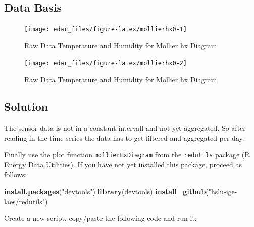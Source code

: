 \documentclass[
  a4paperpaper,
]{book}
\newenvironment{Shaded}{\begin{snugshade}}{\end{snugshade}}
\newcommand{\KeywordTok}[1]{\textcolor[rgb]{0.13,0.29,0.53}{\textbf{#1}}}
\newcommand{\NormalTok}[1]{#1}
\newcommand{\StringTok}[1]{\textcolor[rgb]{0.31,0.60,0.02}{#1}}
\let\oldShaded\Shaded
\let\endoldShaded\endShaded
\renewenvironment{Shaded}{\footnotesize\oldShaded}{\endoldShaded}
\begin{document}
\hypertarget{data-basis-12}{%
\subsection{Data Basis}\label{data-basis-12}}

\begin{figure}
\texttt{[image: edar\_files/figure-latex/mollierhx0-1]} \caption{Raw Data Temperature and Humidity for Mollier hx Diagram}\label{fig:mollierhx0-1}
\end{figure}
\begin{figure}
\texttt{[image: edar\_files/figure-latex/mollierhx0-2]} \caption{Raw Data Temperature and Humidity for Mollier hx Diagram}\label{fig:mollierhx0-2}
\end{figure}

\newpage

\hypertarget{solution-12}{%
\subsection{Solution}\label{solution-12}}

The sensor data is not in a constant intervall and not yet aggregated. So after reading in the time series the data has to get filtered and aggregated per day.

Finally use the plot function \texttt{mollierHxDiagram} from the \texttt{redutils} package (R Energy Data Utilities).
If you have not yet installed this package, proceed as follows:

\begin{Shaded}
\begin{Highlighting}[]
\KeywordTok{install.packages}\NormalTok{(}\StringTok{"devtools"}\NormalTok{)}
\KeywordTok{library}\NormalTok{(devtools)}
\KeywordTok{install_github}\NormalTok{(}\StringTok{"hslu-ige-laes/redutils"}\NormalTok{)}
\end{Highlighting}
\end{Shaded}

Create a new script, copy/paste the following code and run it:
\end{document}
